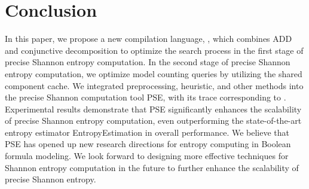\section{Conclusion}
\label{sec:Conclusion}

In this paper, we propose a new compilation language, \ADDAND, which combines ADD and conjunctive decomposition to optimize the search process in the first stage of precise Shannon entropy computation. 
In the second stage of precise Shannon entropy computation, we optimize model counting queries by utilizing the shared component cache.
We integrated preprocessing, heuristic, and other methods into the precise Shannon computation tool PSE, with its trace corresponding to \ADDAND. 
Experimental results demonstrate that PSE significantly enhances the scalability of precise Shannon entropy computation, even outperforming the state-of-the-art entropy estimator EntropyEstimation in overall performance.
We believe that PSE has opened up new research directions for entropy computing in Boolean formula modeling.%
We look forward to designing more effective techniques for Shannon entropy computation in the future to further enhance the scalability of precise Shannon entropy.